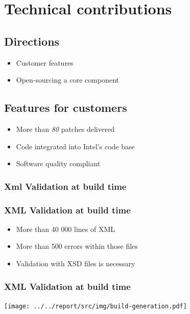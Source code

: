 %
%

\section{Technical contributions}
\subsection{Directions}
\begin{FrameWithSubSection}
    \begin{itemize}
        \item Customer features
        \item Open-sourcing a core component
    \end{itemize}
\end{FrameWithSubSection}


\subsection{Features for customers}
\begin{FrameWithSubSection}
    \begin{itemize}
        \item More than \emph{80} patches delivered
        \item Code integrated into Intel's code base
        \item Software quality compliant
    \end{itemize}
\end{FrameWithSubSection}

\subsubsection{Xml Validation at build time}
\begin{frame}
    \frametitle{XML Validation at build time}
    \begin{itemize}
        \item More than 40 000 lines of XML
        \item More than 500 errors within those files
        \item Validation with XSD files is necessary
    \end{itemize}
\end{frame}

\begin{frame}
    \frametitle{XML Validation at build time}
    \texttt{[image: ../../report/src/img/build-generation.pdf]}
\end{frame}

